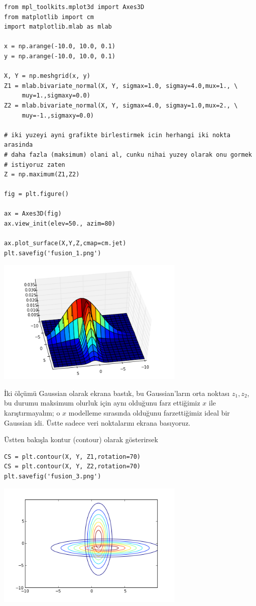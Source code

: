 \documentclass[12pt,fleqn]{article}\usepackage{../../common}
\begin{document}
\begin{verbatim}
from mpl_toolkits.mplot3d import Axes3D
from matplotlib import cm
import matplotlib.mlab as mlab

x = np.arange(-10.0, 10.0, 0.1)
y = np.arange(-10.0, 10.0, 0.1)

X, Y = np.meshgrid(x, y)
Z1 = mlab.bivariate_normal(X, Y, sigmax=1.0, sigmay=4.0,mux=1., \
     muy=1.,sigmaxy=0.0)
Z2 = mlab.bivariate_normal(X, Y, sigmax=4.0, sigmay=1.0,mux=2., \
     muy=-1.,sigmaxy=0.0)

# iki yuzeyi ayni grafikte birlestirmek icin herhangi iki nokta arasinda
# daha fazla (maksimum) olani al, cunku nihai yuzey olarak onu gormek 
# istiyoruz zaten
Z = np.maximum(Z1,Z2)

fig = plt.figure()

ax = Axes3D(fig)
ax.view_init(elev=50., azim=80)

ax.plot_surface(X,Y,Z,cmap=cm.jet)
plt.savefig('fusion_1.png')
\end{verbatim}


\includegraphics[height=6cm]{fusion_1.png}

İki ölçümü Gaussian olarak ekrana bastık, bu Gaussian'ların orta noktası
$z_1,z_2$, bu durumu maksimum olurluk için aynı olduğunu farz ettiğimiz $x$
ile karıştırmayalım; o $x$ modelleme sırasında olduğunu farzettiğimiz ideal
bir Gaussian idi. Üstte sadece veri noktalarını ekrana basıyoruz. 

Üstten bakışla kontur (contour) olarak gösterirsek 

\begin{verbatim}
CS = plt.contour(X, Y, Z1,rotation=70)
CS = plt.contour(X, Y, Z2,rotation=70)
plt.savefig('fusion_3.png')
\end{verbatim}

\includegraphics[height=6cm]{fusion_3.png}
\end{document}
